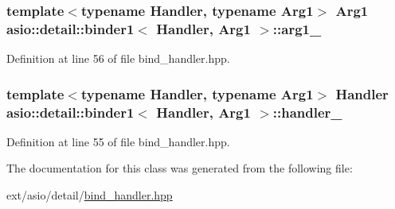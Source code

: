\subsubsection[{arg1\+\_\+}]{\setlength{\rightskip}{0pt plus 5cm}template$<$typename Handler, typename Arg1$>$ Arg1 {\bf asio\+::detail\+::binder1}$<$ Handler, Arg1 $>$\+::arg1\+\_\+}\label{classasio_1_1detail_1_1binder1_a1097fe55b45d93ab5b1b2e209a153241}


Definition at line 56 of file bind\+\_\+handler.\+hpp.

\hypertarget{classasio_1_1detail_1_1binder1_a83f2550a63cac4baba9bdc47eef89b0d}{}
\subsubsection[{handler\+\_\+}]{\setlength{\rightskip}{0pt plus 5cm}template$<$typename Handler, typename Arg1$>$ Handler {\bf asio\+::detail\+::binder1}$<$ Handler, Arg1 $>$\+::handler\+\_\+}\label{classasio_1_1detail_1_1binder1_a83f2550a63cac4baba9bdc47eef89b0d}


Definition at line 55 of file bind\+\_\+handler.\+hpp.



The documentation for this class was generated from the following file\+:\begin{DoxyCompactItemize}
\item 
ext/asio/detail/\hyperlink{bind__handler_8hpp}{bind\+\_\+handler.\+hpp}\end{DoxyCompactItemize}
